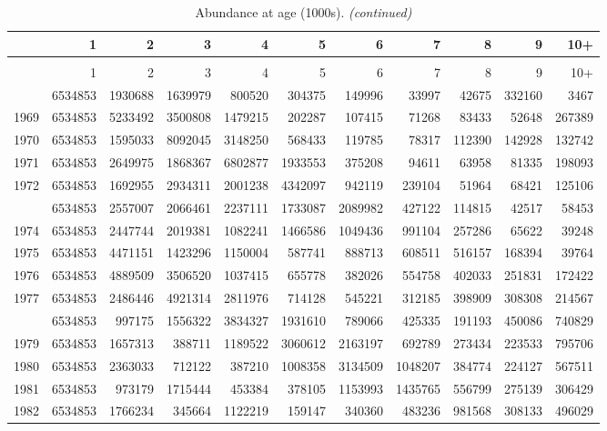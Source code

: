 \documentclass[
]{article}
\begin{document}
\begin{longtable}[t]{lrrrrrrrrrr}
\caption{\label{tab:NAA-table}Abundance at age (1000s).}\\
\toprule
  & 1 & 2 & 3 & 4 & 5 & 6 & 7 & 8 & 9 & 10+\\
\midrule
\endfirsthead
\caption[]{Abundance at age (1000s). \textit{(continued)}}\\
\toprule
  & 1 & 2 & 3 & 4 & 5 & 6 & 7 & 8 & 9 & 10+\\
\midrule
\endhead

\endfoot
\bottomrule
\endlastfoot
1968 & 6534853 & 1930688 & 1639979 & 800520 & 304375 & 149996 & 33997 & 42675 & 332160 & 3467\\
1969 & 6534853 & 5233492 & 3500808 & 1479215 & 202287 & 107415 & 71268 & 83433 & 52648 & 267389\\
1970 & 6534853 & 1595033 & 8092045 & 3148250 & 568433 & 119785 & 78317 & 112390 & 142928 & 132742\\
1971 & 6534853 & 2649975 & 1868367 & 6802877 & 1933553 & 375208 & 94611 & 63958 & 81335 & 198093\\
1972 & 6534853 & 1692955 & 2934311 & 2001238 & 4342097 & 942119 & 239104 & 51964 & 68421 & 125106\\
\addlinespace
1973 & 6534853 & 2557007 & 2066461 & 2237111 & 1733087 & 2089982 & 427122 & 114815 & 42517 & 58453\\
1974 & 6534853 & 2447744 & 2019381 & 1082241 & 1466586 & 1049436 & 991104 & 257286 & 65622 & 39248\\
1975 & 6534853 & 4471151 & 1423296 & 1150004 & 587741 & 888713 & 608511 & 516157 & 168394 & 39764\\
1976 & 6534853 & 4889509 & 3506520 & 1037415 & 655778 & 382026 & 554758 & 402033 & 251831 & 172422\\
1977 & 6534853 & 2486446 & 4921314 & 2811976 & 714128 & 545221 & 312185 & 398909 & 308308 & 214567\\
\addlinespace
1978 & 6534853 & 997175 & 1556322 & 3834327 & 1931610 & 789066 & 425335 & 191193 & 450086 & 740829\\
1979 & 6534853 & 1657313 & 388711 & 1189522 & 3060612 & 2163197 & 692789 & 273434 & 223533 & 795706\\
1980 & 6534853 & 2363033 & 712122 & 387210 & 1008358 & 3134509 & 1048207 & 384774 & 224127 & 567511\\
1981 & 6534853 & 973179 & 1715444 & 453384 & 378105 & 1153993 & 1435765 & 556799 & 275139 & 306429\\
1982 & 6534853 & 1766234 & 345664 & 1122219 & 159147 & 340360 & 483236 & 981568 & 308133 & 496029\\

\end{longtable}
\end{document}
